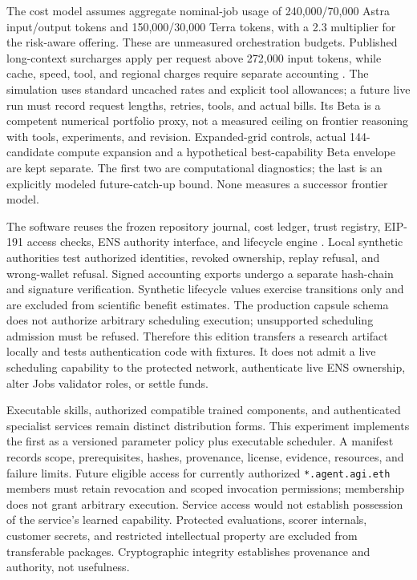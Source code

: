 The cost model assumes aggregate nominal-job usage of 240,000/70,000 Astra input/output tokens and 150,000/30,000 Terra tokens, with a 2.3 multiplier for the risk-aware offering. These are unmeasured orchestration budgets. Published long-context surcharges apply per request above 272,000 input tokens, while cache, speed, tool, and regional charges require separate accounting \cite{openai2026pricing}. The simulation uses standard uncached rates and explicit tool allowances; a future live run must record request lengths, retries, tools, and actual bills. Its Beta is a competent numerical portfolio proxy, not a measured ceiling on frontier reasoning with tools, experiments, and revision. Expanded-grid controls, actual 144-candidate compute expansion and a hypothetical best-capability Beta envelope are kept separate. The first two are computational diagnostics; the last is an explicitly modeled future-catch-up bound. None measures a successor frontier model.

The software reuses the frozen repository journal, cost ledger, trust registry, EIP-191 access checks, ENS authority interface, and lifecycle engine \cite{montrealai2026runtime}. Local synthetic authorities test authorized identities, revoked ownership, replay refusal, and wrong-wallet refusal. Signed accounting exports undergo a separate hash-chain and signature verification. Synthetic lifecycle values exercise transitions only and are excluded from scientific benefit estimates. The production capsule schema does not authorize arbitrary scheduling execution; unsupported scheduling admission must be refused. Therefore this edition transfers a research artifact locally and tests authentication code with fixtures. It does not admit a live scheduling capability to the protected network, authenticate live ENS ownership, alter Jobs validator roles, or settle funds.

Executable skills, authorized compatible trained components, and authenticated specialist services remain distinct distribution forms. This experiment implements the first as a versioned parameter policy plus executable scheduler. A manifest records scope, prerequisites, hashes, provenance, license, evidence, resources, and failure limits. Future eligible access for currently authorized \texttt{*.agent.agi.eth} members must retain revocation and scoped invocation permissions; membership does not grant arbitrary execution. Service access would not establish possession of the service's learned capability. Protected evaluations, scorer internals, customer secrets, and restricted intellectual property are excluded from transferable packages. Cryptographic integrity establishes provenance and authority, not usefulness.

